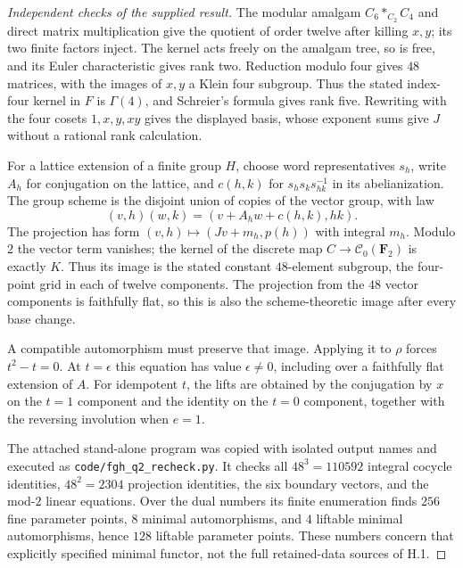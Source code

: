 \begin{proof}[Independent checks of the supplied result]
The modular amalgam $C_6*_{C_2}C_4$ and direct matrix multiplication
give the quotient of order twelve after killing $x,y$; its two
finite factors inject. The kernel acts freely on the amalgam tree,
so is free, and its Euler characteristic gives rank two. Reduction
modulo four gives $48$ matrices, with the images of $x,y$ a Klein
four subgroup. Thus the stated index-four kernel in $F$ is
$\Gamma(4)$, and Schreier's formula gives rank five. Rewriting with
the four cosets $1,x,y,xy$ gives the displayed basis, whose exponent
sums give $J$ without a rational rank calculation.

For a lattice extension of a finite group $H$, choose word
representatives $s_h$, write $A_h$ for conjugation on the lattice,
and $c(h,k)$ for $s_hs_ks_{hk}^{-1}$ in its abelianization. The
group scheme is the disjoint union of copies of the vector group,
with law
\[
 (v,h)(w,k)=(v+A_hw+c(h,k),hk).
\]
The projection has form $(v,h)\mapsto(Jv+m_h,p(h))$ with integral
$m_h$. Modulo $2$ the vector term vanishes; the kernel of the
discrete map $C\to\mathscr C_0(\mathbf F_2)$ is exactly $K$.
Thus its image is the stated constant $48$-element subgroup, the
four-point grid in each of twelve components. The projection from
the $48$ vector components is faithfully flat, so this is also the
scheme-theoretic image after every base change.

A compatible automorphism must preserve that image. Applying it
to $\rho$ forces $t^2-t=0$. At $t=\epsilon$ this equation has
value $\epsilon\ne0$, including over a faithfully flat extension
of $A$. For idempotent $t$, the lifts are obtained by the
conjugation by $x$ on the $t=1$ component and the identity on
the $t=0$ component, together with the reversing involution when
$e=1$.

The attached stand-alone program was copied with isolated output
names and executed as \texttt{code/fgh\_q2\_recheck.py}. It checks
all $48^3=110592$ integral cocycle identities, $48^2=2304$
projection identities, the six boundary vectors, and the mod-$2$
linear equations. Over the dual numbers its finite enumeration
finds $256$ fine parameter points, $8$ minimal automorphisms,
and $4$ liftable minimal automorphisms, hence $128$ liftable
parameter points. These numbers concern that explicitly specified
minimal functor, not the full retained-data sources of H.1.
\end{proof}

